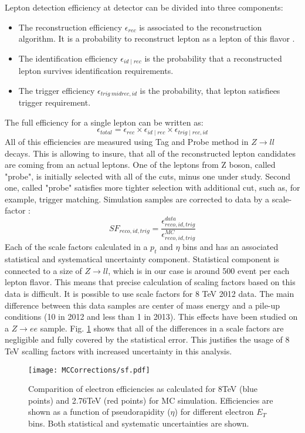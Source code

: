 Lepton detection efficiency at \atlas detector can be divided into three components:
\begin{itemize}
\item The reconstruction efficiency $\epsilon_{rec}$ is associated to the reconstruction algorithm. It is a probability to reconstruct lepton as a lepton of this flavor .
\item The identification efficiency $\epsilon_{id \mid rec}$ is the probability that a reconstructed lepton survives  identification requirements. 
\item The trigger efficiency $\epsilon_{trig \ mid rec,id}$ is the probability, that lepton satisfiees trigger requirement. 
\end{itemize}
The full efficiency for a single lepton can be written as:
\begin{equation}
\epsilon_{total}=\epsilon_{rec} \times \epsilon_{id \mid rec} \times \epsilon_{trig \mid rec,id}
\end{equation}
All of this efficiencies are measured using Tag and Probe method in $Z\to ll$ decays. This is allowing to insure, that all of the reconstructed lepton candidates are coming from an actual leptons. One of the leptons from Z boson, called "probe", is initially selected with all of the cuts, minus one under study. Second one, called "probe" satisfies more tighter selection with additional cut, such as, for example, trigger matching. 
Simulation samples are corrected to data by a scale-factor :
\begin{equation}
SF_{reco,id,trig}=\frac{\epsilon^{data}_{reco,id,trig}}{\epsilon^{MC}_{reco,id,trig}}
\end{equation}
Each of the scale factors calculated in a $p_{t}$ and $\eta$ bins and has an associated statistical and systematical uncertainty component. Statistical component is connected to a size of $Z\to ll$, which is in our case is around 500 event per each lepton flavor. This means that precise calculation of scaling factors based on this data is difficult.
It is possible to use scale factors for 8 TeV 2012 data. The main difference between this data samples are center of mass energy and a pile-up conditions (10 in 2012 and less than 1 in 2013). This effects have been studied on a $Z\to ee$ sample. Fig. \ref{eff_comp} shows that all of the differences in a scale factors are negligible and fully covered by the statistical error. This justifies the usage of 8 TeV scalling factors with increased uncertainty in this analysis. 

\begin{figure}
\centering
\texttt{[image: MCCorrections/sf.pdf]}
\caption{Comparition of electron efficiencies as calculated for 8TeV (blue points) and 2.76TeV (red points) for MC simulation. Efficiencies are shown as a function of pseudorapidity ($\eta$) for different electron $E_T$ bins. Both statistical and systematic uncertainties are shown. }
\label{eff_comp}
\end{figure}

